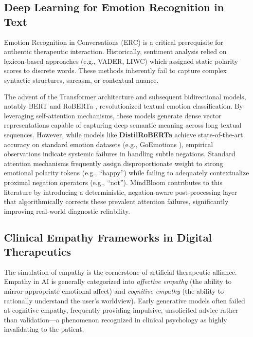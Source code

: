 \documentclass[12pt,twoside]{article}
\begin{document}
\subsection{Deep Learning for Emotion Recognition in Text}

Emotion Recognition in Conversations (ERC) is a critical prerequisite for authentic therapeutic interaction. Historically, sentiment analysis relied on lexicon-based approaches (e.g., VADER, LIWC) which assigned static polarity scores to discrete words. These methods inherently fail to capture complex syntactic structures, sarcasm, or contextual nuance.

The advent of the Transformer architecture \citep{vaswani2017attention} and subsequent bidirectional models, notably BERT \citep{devlin2019bert} and RoBERTa \citep{liu2019roberta}, revolutionized textual emotion classification. By leveraging self-attention mechanisms, these models generate dense vector representations capable of capturing deep semantic meaning across long textual sequences. However, while models like \textbf{DistilRoBERTa} achieve state-of-the-art accuracy on standard emotion datasets (e.g., GoEmotions \citep{demszky2020goemotions}), empirical observations indicate systemic failures in handling subtle negations. Standard attention mechanisms frequently assign disproportionate weight to strong emotional polarity tokens (e.g., ``happy'') while failing to adequately contextualize proximal negation operators (e.g., ``not''). MindBloom contributes to this literature by introducing a deterministic, negation-aware post-processing layer that algorithmically corrects these prevalent attention failures, significantly improving real-world diagnostic reliability.

\subsection{Clinical Empathy Frameworks in Digital Therapeutics}

The simulation of empathy is the cornerstone of artificial therapeutic alliance. Empathy in AI is generally categorized into \textit{affective empathy} (the ability to mirror appropriate emotional affect) and \textit{cognitive empathy} (the ability to rationally understand the user's worldview). Early generative models often failed at cognitive empathy, frequently providing impulsive, unsolicited advice rather than validation---a phenomenon recognized in clinical psychology as highly invalidating to the patient.
\end{document}
